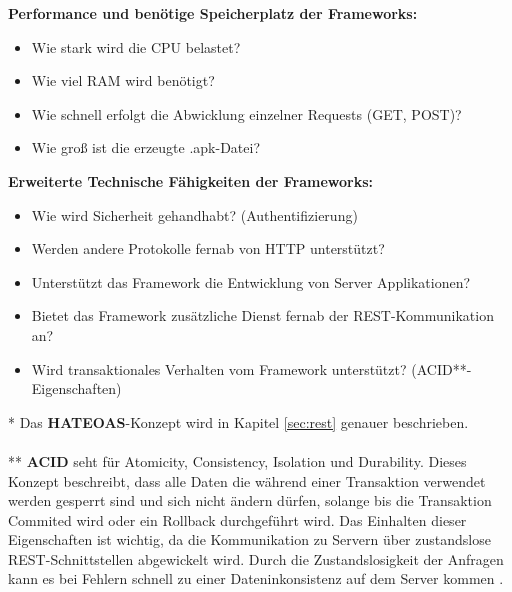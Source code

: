 \textbf{Performance und benötige Speicherplatz der Frameworks:}
\begin{itemize}
	\item Wie stark wird die CPU belastet?  
	\item Wie viel RAM wird benötigt? 
	\item Wie schnell erfolgt die Abwicklung einzelner Requests (GET, POST)?
	\item Wie groß ist die erzeugte .apk-Datei?	
\end{itemize}
\newpage
\textbf{Erweiterte Technische Fähigkeiten der Frameworks:}
\begin{itemize}
	\item Wie wird Sicherheit gehandhabt?  (Authentifizierung)
	\item Werden andere Protokolle fernab von HTTP unterstützt?	
	\item Unterstützt das Framework die Entwicklung von Server Applikationen?
	\item Bietet das Framework zusätzliche Dienst fernab der REST-Kommunikation an?
	\item Wird transaktionales Verhalten vom Framework unterstützt? (ACID**-Eigenschaften)\\
\end{itemize}

* Das \textbf{HATEOAS}-Konzept wird in Kapitel \ref{sec:rest} genauer beschrieben.
\\\\
** \textbf{ACID} seht für Atomicity, Consistency, Isolation und Durability. Dieses Konzept beschreibt, dass alle Daten die während einer Transaktion verwendet werden gesperrt sind und sich nicht ändern dürfen, solange bis die Transaktion Commited wird oder ein Rollback durchgeführt wird. Das Einhalten dieser Eigenschaften ist wichtig, da die Kommunikation zu Servern über zustandslose REST-Schnittstellen abgewickelt wird. Durch die Zustandslosigkeit der Anfragen kann es bei Fehlern schnell zu einer Dateninkonsistenz auf dem Server kommen \cite{braun:Transaktionen}.
